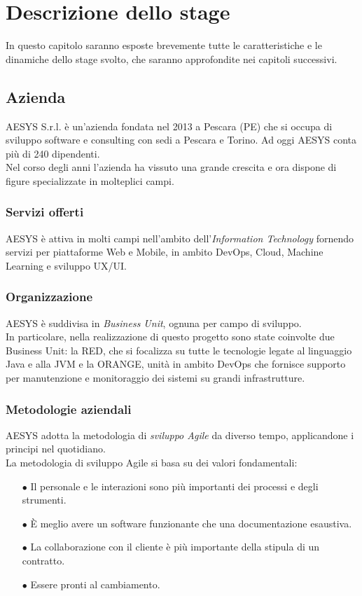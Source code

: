 \chapter{Descrizione dello stage}\label{chapter:descrizione}
In questo capitolo saranno esposte brevemente tutte le caratteristiche e le dinamiche dello stage svolto, che saranno approfondite nei capitoli successivi.

\section{Azienda}\label{sec:azienda}
AESYS S.r.l. è un'azienda fondata nel 2013 a Pescara (PE) che si occupa di sviluppo software e consulting con sedi a Pescara e Torino. Ad oggi AESYS conta più di 240 dipendenti.\\
Nel corso degli anni l'azienda ha vissuto una grande crescita e ora dispone di figure specializzate in molteplici campi.\\

\subsection{Servizi offerti}\label{sec:serviziofferti}
AESYS è attiva in molti campi nell'ambito dell'\emph{Information Technology} fornendo servizi per piattaforme Web e Mobile, in ambito DevOps, Cloud, Machine Learning e sviluppo UX/UI.

\subsection{Organizzazione}\label{sec:organizzazione}
AESYS è suddivisa in \emph{Business Unit}, ognuna per campo di sviluppo.\\
In particolare, nella realizzazione di questo progetto sono state coinvolte due Business Unit: la RED, che si focalizza su tutte le tecnologie legate al linguaggio Java e alla JVM e la ORANGE, unità in ambito DevOps che fornisce supporto per manutenzione e monitoraggio dei sistemi su grandi infrastrutture.

\subsection{Metodologie aziendali}\label{sec:metodologieaziendali}
AESYS adotta la metodologia di \emph{sviluppo Agile} da diverso tempo, applicandone i principi nel quotidiano.\\
La metodologia di sviluppo Agile si basa su dei valori fondamentali:
\begin{itemize}
	\item[$\bullet$]Il personale e le interazioni sono più importanti dei processi e degli strumenti.
	\item[$\bullet$]È meglio avere un software funzionante che una documentazione esaustiva.
	\item[$\bullet$]La collaborazione con il cliente è più importante della stipula di un contratto.
	\item[$\bullet$]Essere pronti al cambiamento.
\end{itemize}

